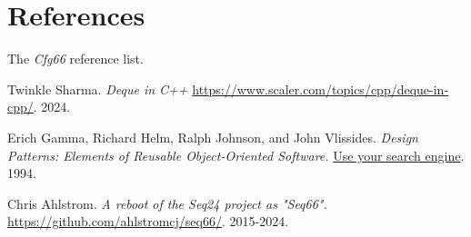 %
%
%

\section{References}
\label{sec:references}

   The \textsl{Cfg66} reference list.

{\RaggedRight
\begin{thebibliography}{99}

   Twinkle Sharma.
   \emph{Deque in C++}
   \url{https://www.scaler.com/topics/cpp/deque-in-cpp/}.
   2024.

   Erich Gamma, Richard Helm, Ralph Johnson, and John Vlissides.
   \emph{Design Patterns: Elements of Reusable Object-Oriented Software.}
   \url{Use your search engine}.
   1994.


   Chris Ahlstrom.
   \emph{A reboot of the Seq24 project as "Seq66".}
   \url{https://github.com/ahlstromcj/seq66/}.
   2015-2024.

\end{thebibliography}
}


